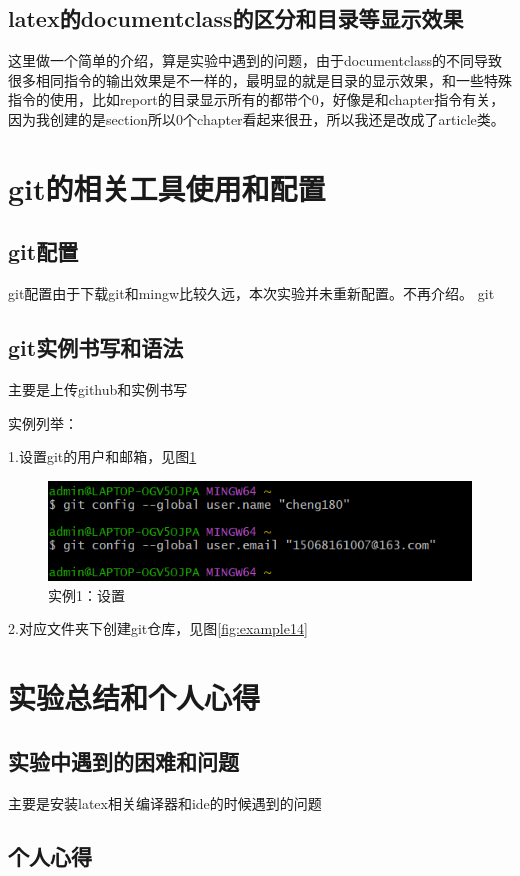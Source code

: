 \documentclass{article}
\begin{document}
	\newpage
	
	\subsection{latex的documentclass的区分和目录等显示效果}
	这里做一个简单的介绍，算是实验中遇到的问题，由于documentclass的不同导致很多相同指令的输出效果是不一样的，最明显的就是目录的显示效果，和一些特殊指令的使用，比如report的目录显示所有的都带个0，好像是和chapter指令有关，因为我创建的是section所以0个chapter看起来很丑，所以我还是改成了article类。
	\newpage
	\section{git的相关工具使用和配置}
	\subsection{git配置}
	git配置由于下载git和mingw比较久远，本次实验并未重新配置。不再介绍。
	git
	\subsection{git实例书写和语法}
	主要是上传github和实例书写
	
	实例列举：
	
	1.设置git的用户和邮箱，见图\ref{fig:example13}
		\begin{figure}[h]  
		\centering
		\includegraphics[width=1\textwidth]{1.png}
		\caption{实例1：设置}
		\label{fig:example13}
	\end{figure}
	
	2.对应文件夹下创建git仓库，见图\ref{fig:example14}
	
	\newpage
	\section{实验总结和个人心得}
	\subsection{实验中遇到的困难和问题}
	主要是安装latex相关编译器和ide的时候遇到的问题
	\newpage
	\subsection{个人心得}
	
\end{document}
